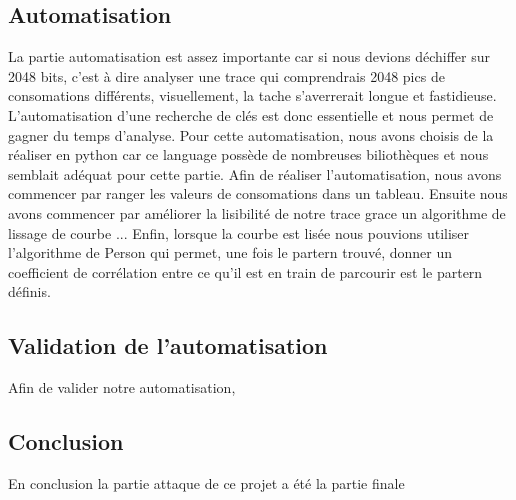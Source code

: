 \subsection{Automatisation}
La partie automatisation est assez importante car si nous devions déchiffer sur 2048 bits, c'est à dire analyser une trace qui comprendrais 2048 pics de consomations différents, visuellement, la tache s'averrerait longue et fastidieuse. L'automatisation d'une recherche de clés est donc essentielle et nous permet de gagner du temps d'analyse.
Pour cette automatisation, nous avons choisis de la réaliser en python car ce language possède de nombreuses biliothèques et nous semblait adéquat pour cette partie.
Afin de réaliser l'automatisation, nous avons commencer par ranger les valeurs de consomations dans un tableau. 
Ensuite nous avons commencer par améliorer la lisibilité de notre trace grace un algorithme de lissage de courbe ...
Enfin, lorsque la courbe est lisée nous pouvions utiliser l'algorithme de Person qui permet, une fois le partern trouvé, donner un coefficient de corrélation entre ce qu'il est en train de parcourir est le partern définis.

\subsection{Validation de l'automatisation}
Afin de valider notre automatisation, 
\subsection{Conclusion}
En conclusion la partie attaque de ce projet a été la partie finale 
